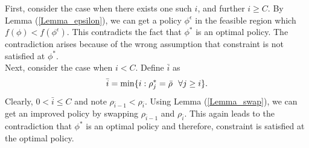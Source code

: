 First, consider the case when there exists one such $i$, and further  $i \geq C$. By Lemma (\ref{Lemma_epsilon}), we can get a policy $\phi^\epsilon$ in the feasible region which $f(\phi) < f(\phi^\epsilon)$. This contradicts the fact that $\phi^*$ is an optimal policy. The contradiction arises because of the wrong assumption that constraint is not satisfied at $\phi^*$. \\
%
Next, consider the case when $i <C$. Define $\bar{i}$ as
$$
\bar{i} = \min \{ i: \rho_j^* = \rmax \ \ \forall j \geq i \}.
$$
Clearly, $0 < \bar{i} \leq C$ and note $\rho_{\bar{i} - 1} < \rho_{\bar{i}}$. Using Lemma (\ref{Lemma_swap}), we can get an improved policy by swapping  $\rho_{\bar{i} - 1}$ and $\rho_{\bar{i}}$. This again leads to the contradiction that $\phi^*$ is an optimal policy and therefore, constraint is satisfied at the optimal policy.\\
%
%
%  
%
%
%
%  
%  
